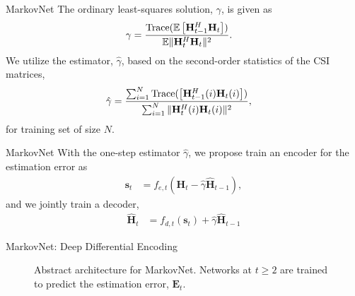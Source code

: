 \documentclass{beamer}
\begin{document}
  \begin{frame}{MarkovNet}
    The ordinary least-squares solution, $\gamma$, is given as
    \begin{align*}
      \gamma &= \frac{\text{Trace}(\mathbb E\left[\mathbf H_{t-1}^H\mathbf H_{t}\right])}{\mathbb E\Arrowvert\mathbf H_t^H \mathbf H_t\Arrowvert^2}.
    \end{align*}
    We utilize the estimator, $\hat \gamma$, based on the second-order statistics of the CSI matrices,
    \begin{align*}
      \hat \gamma &= \frac{\sum_{i=1}^N\text{Trace}(\left[\mathbf H_{t-1}^H(i)\mathbf H_{t}(i)\right])}{\sum_{i=1}^N\Arrowvert\mathbf H_t^H(i) \mathbf H_t(i)\Arrowvert^2},
    \end{align*}
    for training set of size $N$.
  \end{frame}

  \begin{frame}{MarkovNet}
    With the one-step estimator $\hat\gamma$, we propose train an encoder for the estimation error as
    \begin{align*}
      \mathbf s_t &= f_{e,t} (\mathbf H_t - \hat \gamma \hat {\mathbf H}_{t-1}),
    \end{align*}
    and we jointly train a decoder,
    \begin{align*}
      \hat{\mathbf H}_t &= f_{d,t}(\mathbf s_t) + \hat\gamma\hat{\mathbf H}_{t-1}
    \end{align*}
  \end{frame}

  \begin{frame}{MarkovNet: Deep Differential Encoding}
    \begin{figure}[!hbtp]
    \centering
    {
      \fontsize{4pt}{6pt}
      \def\svgwidth{0.8\columnwidth}
      
    }
    \caption{Abstract architecture for MarkovNet. Networks at $t \geq 2$ are trained to predict the estimation error, $\mathbf E_t$.}
    \label{fig:markovnet_schema}
    \end{figure}
  \end{frame}
\end{document}
